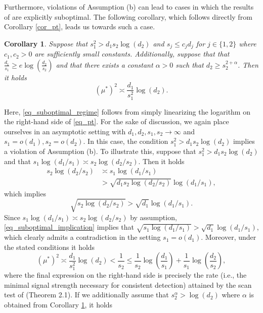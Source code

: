\documentclass{article}
\newtheorem{corollary}{Corollary}
\theoremstyle{remark}
\begin{document}
    Furthermore, violations of Assumption (b) can lead to cases in which the results of \citet{butucea2013detection} are explicitly suboptimal. The following corollary, which follows directly from Corollary \ref{cor_pt}, leads us towards such a case.
    
    \begin{corollary}\label{cor_suboptimal_regime}
        Suppose that $s_1^2 > d_1 s_2 \log(d_2)$ and $s_j \leq c_j d_j$ for $j \in \{1, 2\}$ where $c_1,c_2 > 0$ are sufficiently small constants. Additionally, suppose that that $\frac{d_1}{s_1} \geq e \log(\frac{d_2}{s_2})$ and that there exists a constant $\alpha > 0$ such that $d_2 \geq s_2^{2 + \alpha}$. Then it holds
\begin{equation}\label{eq_suboptimal_regime}
    (\mu^*)^2 \asymp \frac{d_1}{s_1^2}\log(d_2).
\end{equation}
    \end{corollary}
    Here, \eqref{eq_suboptimal_regime} follows from simply linearizing the logarithm on the right-hand side of \eqref{eq_pt}. For the sake of discussion, we again place ourselves in an asymptotic setting with $d_1, d_2, s_1, s_2 \rightarrow \infty$ and $s_1 = o(d_1), s_2 = o(d_2)$. In this case, the condition $s_1^2 > d_1 s_2 \log(d_2)$ implies a violation of Assumption (b). To illustrate this, suppose that $s_1^2 > d_1 s_2 \log(d_2)$ and that $s_1\log(d_1/s_1) \asymp s_2 \log(d_2/s_2)$. Then it holds
    \begin{align}
        s_2 \log(d_2/s_2) &\asymp s_1\log(d_1/s_1) \\
        &> \sqrt{d_1s_2\log(d_2/s_2)} \log(d_1/s_1),
    \end{align}
    which implies
    \begin{equation}\label{eq_suboptimal_implication}
         \sqrt{s_2 \log(d_2/s_2)} > \sqrt{d_1}\log(d_1/s_1).
    \end{equation}
    Since  $s_1\log(d_1/s_1) \asymp s_2 \log(d_2/s_2)$ by assumption, \eqref{eq_suboptimal_implication} implies that $\sqrt{s_1 \log(d_1/s_1)} > \sqrt{d_1}\log(d_1/s_1)$, which clearly admits a contradiction in the setting $s_1 = o(d_1)$. Moreover, under the stated conditions it holds
    \begin{equation}
        (\mu^*)^2 \asymp \frac{d_1}{s_1^2}\log(d_2) < \frac{1}{s_2} \leq \frac{1}{s_2}\log\left(\frac{d_1}{s_1}\right) + \frac{1}{s_1}\log\left(\frac{d_2}{s_2}\right),
    \end{equation}
    where the final expression on the right-hand side is precisely the rate (i.e., the minimal signal strength necessary for consistent detection) attained by the scan test of \citet{butucea2013detection} (Theorem 2.1). If we additionally assume that $s_2^{\alpha} > \log(d_2)$ where $\alpha$ is obtained from Corollary \ref{cor_suboptimal_regime}, it holds
\end{document}
